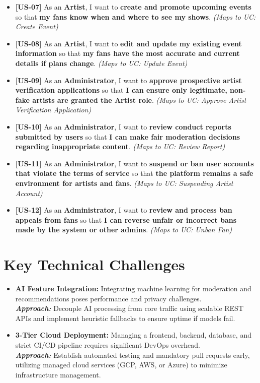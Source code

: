 \documentclass[11pt]{report}
\begin{document}
\begin{itemize}
  \item \textbf{[US-07]} As an \textbf{Artist}, I want to \textbf{create and promote upcoming events} so that \textbf{my fans know when and where to see my shows}. \textit{(Maps to UC: Create Event)}

  \item \textbf{[US-08]} As an \textbf{Artist}, I want to \textbf{edit and update my existing event information} so that \textbf{my fans have the most accurate and current details if plans change}. \textit{(Maps to UC: Update Event)}

  \item \textbf{[US-09]} As an \textbf{Administrator}, I want to \textbf{approve prospective artist verification applications} so that \textbf{I can ensure only legitimate, non-fake artists are granted the Artist role}. \textit{(Maps to UC: Approve Artist Verification Application)}

  \item \textbf{[US-10]} As an \textbf{Administrator}, I want to \textbf{review conduct reports submitted by users} so that \textbf{I can make fair moderation decisions regarding inappropriate content}. \textit{(Maps to UC: Review Report)}

  \item \textbf{[US-11]} As an \textbf{Administrator}, I want to \textbf{suspend or ban user accounts that violate the terms of service} so that \textbf{the platform remains a safe environment for artists and fans}. \textit{(Maps to UC: Suspending Artist Account)}

  \item \textbf{[US-12]} As an \textbf{Administrator}, I want to \textbf{review and process ban appeals from fans} so that \textbf{I can reverse unfair or incorrect bans made by the system or other admins}. \textit{(Maps to UC: Unban Fan)}
\end{itemize}

\chapter{Key Technical Challenges}

\begin{itemize}
  \item \textbf{AI Feature Integration:} Integrating machine learning for moderation and recommendations poses performance and privacy challenges. \\
  \textbf{\textit{Approach:}} Decouple AI processing from core traffic using scalable REST APIs and implement heuristic fallbacks to ensure uptime if models fail.

  \item \textbf{3-Tier Cloud Deployment:} Managing a frontend, backend, database, and strict CI/CD pipeline requires significant DevOps overhead. \\
  \textbf{\textit{Approach:}} Establish automated testing and mandatory pull requests early, utilizing managed cloud services (GCP, AWS, or Azure) to minimize infrastructure management.
\end{itemize}
\end{document}
